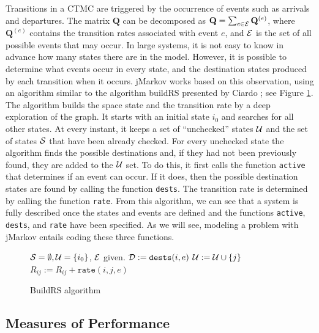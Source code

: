 \documentclass[11pt,letterpaper]{article}
\newcommand{\bQ}{{\mathbf Q}}
\newcommand{\cS}{{\cal S}}
\newcommand{\cE}{{\cal E}}
\newcommand{\cU}{{\cal U}}
\newcommand{\cD}{{\cal D}}
\newcommand{\Active}{\texttt{active}\xspace}
\newcommand{\Rate}{\texttt{rate}\xspace}
\newcommand{\Dests}{\texttt{dests}\xspace}
\begin{document}
Transitions in a CTMC are triggered by the occurrence of events such as arrivals
and departures.  The matrix $\bQ$ can be decomposed as
$\bQ =\sum_{e\in\cE}\bQ^{(e)}$, where $\bQ^{(e)}$ contains the transition rates
associated with event $e$, and $\cE$ is the set of all possible events that may
occur.  In large systems, it is not easy to know in advance how many states
there are in the model.  However, it is possible to determine what events occur
in every state, and the destination states produced by each transition when it
occurs.  jMarkov works based on this observation, using an algorithm similar to
the algorithm buildRS presented by Ciardo \cite{ciar00}; see Figure
\ref{Algt:BuildRS}.  The algorithm builds the space state and the transition
rate by a deep exploration of the graph. It starts with an initial state $i_0$
and searches for all other states.  At every instant, it keeps a set of
``unchecked'' states $\cU$ and the set of states $\cS$ that have been already
checked.  For every unchecked state the algorithm finds the possible
destinations and, if they had not been previously found, they are added to the
$\cU$ set.  To do this, it first calls the function \Active\index{\Active} that
determines if an event can occur.  If it does, then the possible destination
states are found by calling the function \Dests\index{\Dests}.  The transition
rate is determined by calling the function \Rate\index{\Rate}.  From this
algorithm, we can see that a system is fully described once the states and
events are defined and the functions \Active, \Dests, and \Rate have been
specified.  As we will see, modeling a problem with jMarkov entails coding these
three functions.

\begin{figure}[htb]
\begin{algorithmic}
  \STATE $\cS = \emptyset, \cU = \{i_0\}$, $\cE$ given.%
  \WHILE{$\cU\neq\phi$}
    \FORALL{$e\in\cE$}
      \IF{$\Active(i,e)$}
        \STATE $\cD := \Dests(i,e)$
        \FORALL {$j\in\cD$}
          \IF{$j\notin\cS\cup\cU$}
            \STATE $\cU := \cU \cup \{j\} $
          \ENDIF
          \STATE $R_{ij}:= R_{ij} + \Rate(i,j,e)$
        \ENDFOR
      \ENDIF
    \ENDFOR
  \ENDWHILE
\end{algorithmic}
\caption{BuildRS algorithm} \label{Algt:BuildRS}
\end{figure}

\subsection{Measures of Performance}
\label{sec:MOPs}
\end{document}
